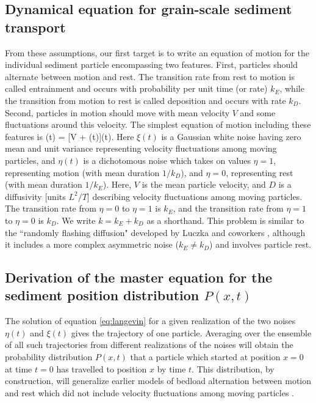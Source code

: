 \subsection{Dynamical equation for grain-scale sediment transport}
From these assumptions, our first target is to write an equation of motion for the individual sediment particle encompassing two features. First, particles should alternate between motion and rest. The transition rate from rest to motion is called entrainment and occurs with probability per unit time (or rate) $k_E$, while the transition from motion to rest is called deposition and occurs with rate $k_D$. Second, particles in motion should move with mean velocity $V$ and some fluctuations around this velocity. 
The simplest equation of motion including these features is
\be {}(t) = [V + \xi(t)]\eta(t).  \label{eq:langevin} \ee
Here $\xi(t)$ is a Gaussian white noise having zero mean and unit variance representing velocity fluctuations among moving particles, and $\eta(t)$ is a dichotomous noise which takes on values $\eta = 1$, representing motion (with mean duration $1/k_D$), and $\eta=0$, representing rest (with mean duration $1/k_E$). Here, $V$ is the mean particle velocity, and $D$ is a diffusivity [units $L^2/T$] describing velocity fluctuations among moving particles. The transition rate from $\eta=0$ to $\eta = 1$ is $k_E$, and the transition rate from $\eta=1$ to $\eta= 0$ is $k_D$. We write $k=k_E+k_D$ as a shorthand. This problem is similar to the ``randomly flashing diffusion" developed by Luczka and coworkers \citep{uczka1992,Luczka1993,Luczka1995}, although it includes a more complex asymmetric noise ($k_E\neq k_D$) and involves particle rest.

\subsection{Derivation of the master equation for the sediment position distribution $P(x,t)$}
The solution of equation \ref{eq:langevin} for a given realization of the two noises $\eta(t)$ and $\xi(t)$ gives the trajectory of one particle. Averaging over the ensemble of all such trajectories from different realizations of the noises will obtain the probability distribution $P(x,t)$ that a particle which started at position $x=0$ at time $t=0$ has travelled to position $x$ by time $t$. This distribution, by construction, will generalize earlier models of bedload alternation between motion and rest which did not include velocity fluctuations among moving particles \citep{Lisle1998,Lajeunesse2017}.

